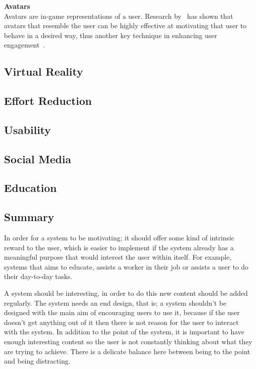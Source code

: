 \documentclass[a4paper,12pt]{article}
\begin{document}
\par
\textbf{Avatars}\\
Avatars are in-game representations of a user. 
Research by~\citet{self-modeling} has shown that avatars that resemble the user can be highly effective at motivating that user to behave in a desired way, thus another key technique in enhancing user engagement~\citep{bread-and-games}.

\subsection{Virtual Reality}\label{sec:virtual-reality}


\subsection{Effort Reduction}\label{sec:effort-reduction}

\subsection{Usability}

\subsection{Social Media}\label{sec:social-media}

\subsection{Education}
\subsection{Summary}
In order for a system to be motivating; it should offer some kind of intrinsic reward to the user, which is easier to implement if the system already has a meaningful purpose that would interest the user within itself. 
For example, systems that aims to educate, assists a worker in their job or assists a user to do their day-to-day tasks.

\par
A system should be interesting, in order to do this new content should be added regularly. 
The system needs an end design, that is; a system shouldn't be designed with the main aim of encouraging users to use it, because if the user doesn't get anything out of it then there is not reason for the user to interact with the system. 
In addition to the point of the system, it is important to have enough interesting content so the user is not constantly thinking about what they are trying to achieve. 
There is a delicate balance here between being to the point and being distracting.
\end{document}
